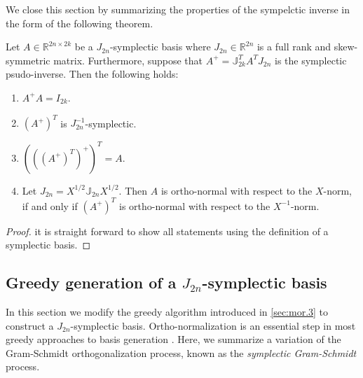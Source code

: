 We close this section by summarizing the properties of the sympelctic inverse in the form of the following theorem.
\begin{theorem} \label{thm:2}
Let $A\in \mathbb R^{2n\times 2k}$ be a $J_{2n}$-symplectic basis where $J_{2n}\in\mathbb R^{2n}$ is a full rank and skew-symmetric matrix. Furthermore, suppose that $A^{+} = \mathbb{J}_{2k}^T A^T J_{2n}$ is the symplectic psudo-inverse. Then the following holds:
\begin{enumerate}
\item $A^+A = I_{2k}$.
\item $(A^+)^T$ is $J_{2n}^{-1}$-symplectic.
\item $\left(\left(\left(A^+\right)^T\right)^+\right)^T = A$.
\item Let $J_{2n}=X^{1/2}\mathbb J_{2n} X^{1/2}$. Then $A$ is ortho-normal with respect to the $X$-norm, if and only if $(A^+)^T$ is ortho-normal with respect to the $X^{-1}$-norm.
\end{enumerate}
\end{theorem}
\begin{proof}
it is straight forward to show all statements using the definition of a symplectic basis.
\end{proof}

\subsection{Greedy generation of a $J_{2n}$-symplectic basis} \label{sec:normmor.2}
In this section we modify the greedy algorithm introduced in \cref{sec:mor.3} to construct a $J_{2n}$-symplectic basis. Ortho-normalization is an essential step in most greedy approaches to basis generation \cite{hesthaven2015certified,quarteroni2015reduced}. Here, we summarize a variation of the Gram-Schmidt orthogonalization process, known as the \emph{symplectic Gram-Schmidt} process.

